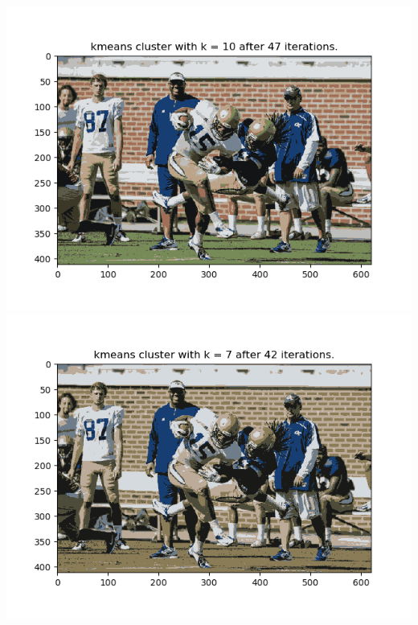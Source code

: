 \documentclass[twoside,10pt]{article}
\begin{document}
\begin{enumerate}
    \begin{center}\includegraphics[scale=0.5]{images/kmeans1.png}\includegraphics[scale=0.5]{images/kmeans2.png}\end{center}
\end{enumerate}
\end{document}
